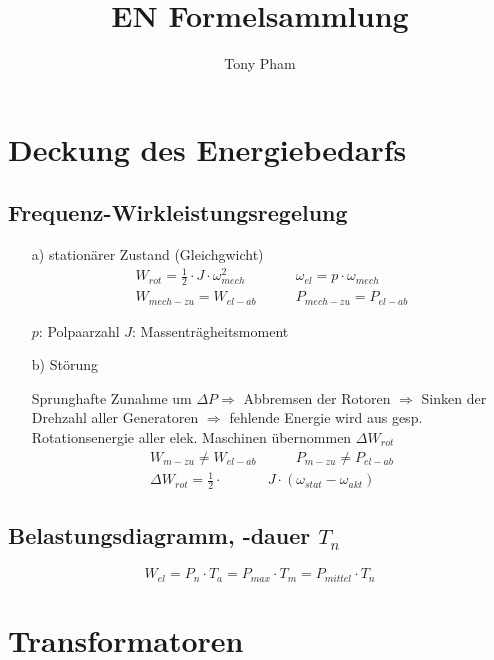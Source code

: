 \documentclass[a4paper,11pt]{article}
\title{EN Formelsammlung}
\author{Tony Pham}
\begin{document}
\maketitle
\tableofcontents
\twocolumn

\section{Deckung des Energiebedarfs}
	\subsection{Frequenz-Wirkleistungsregelung}

	\begin{enumerate}
		\item[a)]{stationärer Zustand (Gleichgwicht)}
		\begin{align*}
			 W_{rot} = \frac{1}{2} \cdot J \cdot \omega_{mech} ^{2} &\qquad
			 \omega_{el} = p  \cdot \omega_{mech} \\
			 W_{mech-zu} = W_{el-ab} &\qquad
			 P_{mech-zu} = P_{el-ab}
		\end{align*}

		$p$: Polpaarzahl \quad
		$J$: Massenträgheitsmoment

		\item[b)]{Störung}

		Sprunghafte Zunahme um $ \Delta P \Rightarrow$
		Abbremsen der Rotoren $\Rightarrow$ Sinken der Drehzahl aller Generatoren
		$\Rightarrow$ fehlende Energie wird aus gesp. Rotationsenergie aller elek.
		Maschinen übernommen $\Delta W_{rot}$
		\begin{align*}
			W_{m-zu} \neq W_{el-ab} &\qquad
			P_{m-zu} \neq P_{el-ab} \\
			\Delta W_{rot} = \frac{1}{2} \cdot & J \cdot (\omega_{stat} - \omega_{akt})
		\end{align*}
	\end{enumerate}

	\subsection{Belastungsdiagramm, -dauer $T_{n}$}

\[ W_{el} = P_{n} \cdot T_{a} = P_{max} \cdot T_{m} = P_{mittel} \cdot T_{n} \]

\section{Transformatoren}
\end{document}
